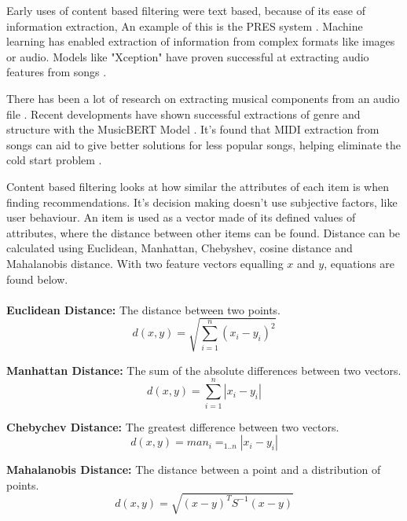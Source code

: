 Early uses of content based filtering were text based, because of its ease of information extraction, An example of this is the PRES system \citep{van_meteren_using_2000}. Machine learning has enabled extraction of information from complex formats like images or audio. Models like "Xception" have proven successful at extracting audio features from songs \citep{chollet_xception_2017, singh_robustness_2022}.

There has been a lot of research on extracting musical components from an audio file \citep{ribecky_multi-input_2021, zhao_musical_2022}. Recent developments have shown successful extractions of genre and structure with the MusicBERT Model \citep{zhu_musicbert_2021}. It's found that MIDI extraction from songs can aid to give better solutions for less popular songs, helping eliminate the cold start problem \citep{yadav_improved_2022}.

Content based filtering looks at how similar the attributes of each item is when finding recommendations. It's decision making doesn't use subjective factors, like user behaviour. An item is used as a vector made of its defined values of attributes, where the distance between other items can be found. Distance can be calculated using Euclidean, Manhattan, Chebyshev, cosine distance and Mahalanobis distance. With two feature vectors equalling $x$ and $y$, equations are found below.
\\
\\
\textbf{Euclidean Distance:} The distance between two points.
\begin{equation}
	d(x,y) = \sqrt{\sum _{i=1} ^{n}(x_{i} - y_{i})^{2}}
\end{equation}

\textbf{Manhattan Distance:} The sum of the absolute differences between two vectors.
\begin{equation}
	d(x,y) = \sum _{i=1} ^{n} | x_{i} - y_{i} |
\end{equation}

\textbf{Chebychev Distance:} The greatest difference between two vectors.
\begin{equation}
	d(x,y) = man_{i} = _{1 . . n} | x_{i} - y_{i} |
\end{equation}

\textbf{Mahalanobis Distance:} The distance between a point and a distribution of points.
\begin{equation}
	d(x,y) = \sqrt{ ( x - y )^{ T } S^{ -1 } ( x - y ) }
\end{equation}

